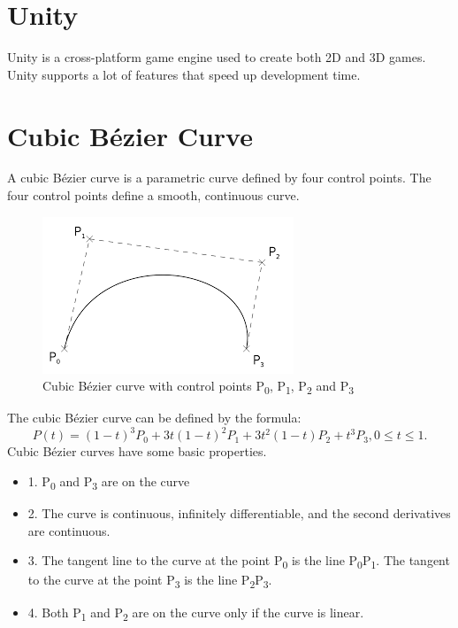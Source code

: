 

\section{Unity}
Unity is a cross-platform game engine used to create both 2D and 3D games. Unity supports a lot of features that speed up development time. 

\section{Cubic Bézier Curve}
A cubic Bézier curve is a parametric curve defined by four control points. The four control points define a smooth, continuous curve.

\begin{figure}[!h]
    \centering
    \includegraphics[scale=0.5]{Project_report/figures/bezier-curve.png}
    \caption{Cubic Bézier curve with control points P\textsubscript{0}, P\textsubscript{1}, P\textsubscript{2} and P\textsubscript{3}}
\end{figure}

The cubic Bézier curve can be defined by the formula\cite{Cubic-Bézier-Curves}: \[P(t) = (1-t)^3P_0 + 3t(1 - t)^2P_1 + 3t^2(1 - t)P_2 + t^3P_3, 0 \le t \le 1. \]
Cubic Bézier curves have some basic properties.
\begin{itemize}
    \item 1. P\textsubscript{0} and P\textsubscript{3} are on the curve
    \item 2. The curve is continuous, infinitely differentiable, and the second derivatives are continuous.
    \item 3. The tangent line to the curve at the point P\textsubscript{0} is the line P\textsubscript{0}P\textsubscript{1}. The tangent to the
curve at the point P\textsubscript{3} is the line P\textsubscript{2}P\textsubscript{3}.
    \item 4. Both P\textsubscript{1} and P\textsubscript{2} are on the curve only if the curve is linear.
\end{itemize}

